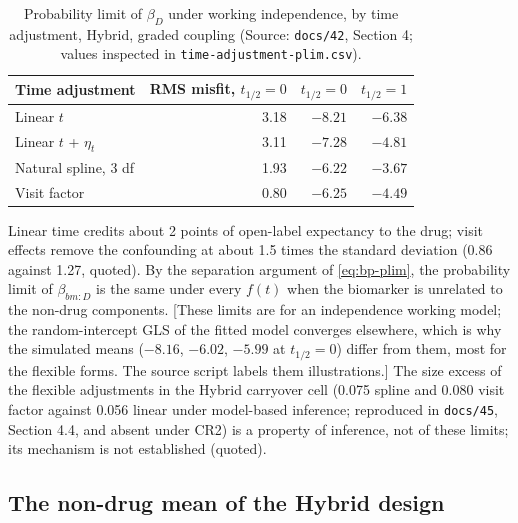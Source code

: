 \documentclass[11pt]{article}
\newcommand{\note}[1]{\textcolor{blue!60!black}{\small [#1]}}
\newcommand{\code}[1]{\texttt{#1}}
\begin{document}
\begin{table}[h]
\centering\small
\caption{Probability limit of $\beta_D$ under working independence, by
time adjustment, Hybrid, graded coupling (Source: \code{docs/42},
Section 4; values inspected in \code{time-adjustment-plim.csv}).}
\label{tab:bp-plim}
\begin{tabular}{@{}lrrr@{}}
\toprule
Time adjustment & RMS misfit, $t_{1/2} = 0$ & $t_{1/2} = 0$ & $t_{1/2} = 1$ \\
\midrule
Linear $t$ & 3.18 & $-8.21$ & $-6.38$ \\
Linear $t$ + $\eta_t$ & 3.11 & $-7.28$ & $-4.81$ \\
Natural spline, 3 df & 1.93 & $-6.22$ & $-3.67$ \\
Visit factor & 0.80 & $-6.25$ & $-4.49$ \\
\bottomrule
\end{tabular}
\end{table}

\noindent Linear time credits about 2 points of open-label expectancy to
the drug; visit effects remove the confounding at about 1.5 times the
standard deviation (0.86 against 1.27, quoted). By the separation
argument of \eqref{eq:bp-plim}, the probability limit of
$\beta_{bm:D}$ is the same under every $f(t)$ when the biomarker is
unrelated to the non-drug components. \note{These limits are for an
independence working model; the random-intercept GLS of the fitted
model converges elsewhere, which is why the simulated means ($-8.16$,
$-6.02$, $-5.99$ at $t_{1/2} = 0$) differ from them, most for the
flexible forms. The source script labels them illustrations.} The size
excess of the flexible adjustments in the Hybrid carryover cell (0.075
spline and 0.080 visit factor against 0.056 linear under model-based
inference; reproduced in \code{docs/45}, Section 4.4, and absent under
CR2) is a property of inference, not of these limits; its mechanism is
not established (quoted).

\subsection{The non-drug mean of the Hybrid design}
\label{sec:invf-means}
\end{document}

